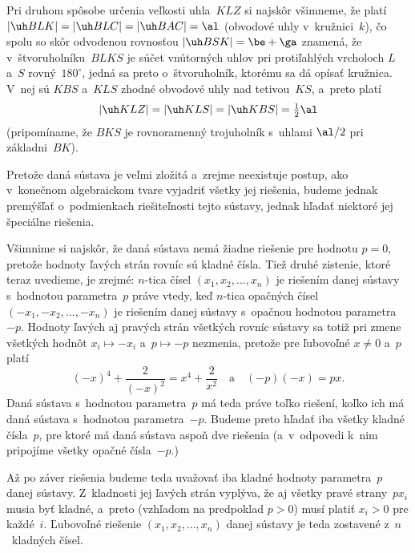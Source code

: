 {\smallskip
Pri druhom spôsobe určenia veľkosti uhla~$KLZ$ si najskôr
všimneme, že platí $|\uh BLK|=|\uh BLC|=|\uh BAC|=\al$
(obvodové uhly v~kružnici~$k$), čo spolu so skôr odvodenou rovnosťou
$|\uh BSK|=\be+\ga$ znamená, že v~štvoruholníku~$BLKS$ je
súčet vnútorných uhlov pri protiľahlých vrcholoch $L$ a~$S$
rovný~$180^{\circ}$, jedná sa preto o~štvoruholník,
ktorému sa dá opísať kružnica. V~nej sú $KBS$
a~$KLS$ zhodné obvodové uhly nad tetivou~$KS$, a~preto platí
$$
|\uh KLZ|=|\uh KLS|=|\uh KBS|=\tfrac12\al
$$
(pripomíname, že $BKS$ je rovnoramenný trojuholník s~uhlami
$\al/2$ pri základni~$BK$).}

{%
Pretože daná sústava je veľmi zložitá a~zrejme neexistuje
postup, ako v~konečnom algebraickom tvare vyjadriť všetky jej
riešenia, budeme jednak premýšľať o~podmienkach riešiteľnosti tejto
sústavy, jednak hľadať niektoré jej špeciálne riešenia.

Všimnime si najskôr, že daná sústava nemá žiadne riešenie pre
hodnotu $p=0$, pretože hodnoty ľavých strán rovníc sú kladné
čísla. Tiež druhé zistenie, ktoré teraz uvedieme, je zrejmé:
$n$-tica čísel $(x_1,x_2,\dots,x_n)$ je riešením danej sústavy
s~hodnotou parametra~$p$ práve vtedy, keď $n$-tica opačných čísel
$({-x_1},{-x_2},\dots,{-x_n})$ je riešením danej sústavy s~opačnou
hodnotou parametra~${-p}$. Hodnoty ľavých aj pravých strán všetkých
rovníc sústavy sa totiž pri zmene všetkých hodnôt $x_i\mapsto{-x_i}$
a~$p\mapsto{-p}$ nezmenia, pretože pre ľubovoľné $x\ne0$ a~$p$ platí
$$
(- x)^4+\frac{2}{(- x)^2}=x^4+\frac{2}{x^2}\quad\text{a}\quad
(- p)(- x)=px.
$$
Daná sústava s~hodnotou parametra~$p$ má teda práve toľko riešení,
koľko ich má daná sústava s~hodnotou parametra~${-p}$.
Budeme preto hľadať iba všetky kladné čísla~$p$, pre
ktoré má daná sústava aspoň dve riešenia (a~v~odpovedi k~nim
pripojíme všetky opačné čísla~${- p}$.)

Až po záver riešenia budeme teda uvažovať iba kladné hodnoty
parametra~$p$ danej sústavy. Z~kladnosti jej ľavých strán
vyplýva, že aj všetky pravé strany~$px_i$ musia byť kladné,
a~preto (vzhľadom na predpoklad $p>0$) musí platiť $x_i>0$ pre
každé~$i$. Ľubovoľné riešenie $(x_1,x_2,\dots,x_n)$ danej sústavy
je teda zostavené z~$n$~kladných čísel.

}
